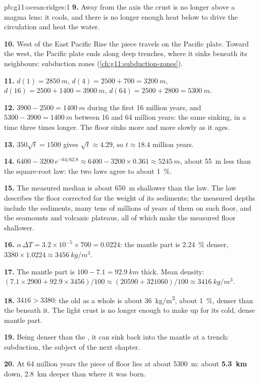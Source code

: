 \begin{solution}{pb:g11:ocean-ridges:1}
\textbf{9.} Away from the axis the crust is no longer above a magma lens: it
cools, and there is no longer enough heat below to drive the circulation and
heat the water.

\textbf{10.} West of the East Pacific Rise the piece travels on the Pacific
plate. Toward the west, the Pacific plate ends along deep trenches, where it
sinks beneath its neighbours: subduction zones (\cref{ch:g11:subduction-zones}).

\textbf{11.} $d(1) = \qty{2850}{m}$, $d(4) = 2500 + 700 = \qty{3200}{m}$,
$d(16) = 2500 + 1400 = \qty{3900}{m}$, $d(64) = 2500 + 2800 = \qty{5300}{m}$.

\textbf{12.} $3900 - 2500 = \qty{1400}{m}$ during the first 16 million years,
and $5300 - 3900 = \qty{1400}{m}$ between 16 and 64 million years: the same
sinking, in a time three times longer. The floor sinks more and more slowly
as it ages.

\textbf{13.} $350\sqrt{t} = 1500$ gives $\sqrt{t} \approx 4.29$, so
$t \approx 18.4$ million years.

\textbf{14.} $6400 - 3200\,e^{-64/62.8} \approx 6400 - 3200 \times 0.361
\approx \qty{5245}{m}$, about \qty{55}{m} less than the square-root law: the
two laws agree to about \qty{1}{\percent}.

\textbf{15.} The measured median is about \qty{650}{m} shallower than the
law. The law describes the floor corrected for the weight of its sediments;
the measured depths include the sediments, many tens of millions of years of
them on such floor, and the seamounts and volcanic plateaus, all of which make
the measured floor shallower.

\textbf{16.} $\alpha\,\Delta T = 3.2 \times 10^{-5} \times 700 = 0.0224$: the
mantle part is \qty{2.24}{\percent} denser,
$3380 \times 1.0224 \approx \qty{3456}{kg/m^3}$.

\textbf{17.} The mantle part is $100 - 7.1 = \qty{92.9}{km}$ thick. Mean
density: $(7.1 \times 2900 + 92.9 \times 3456)/100 \approx (20590 + 321060)/100
\approx \qty{3416}{kg/m^3}$.

\textbf{18.} $3416 > 3380$: the old  as a whole is about
\qty{36}{kg/m^3}, about \qty{1}{\percent}, denser than the 
beneath it. The light crust is no longer enough to make up for its cold,
dense mantle part.

\textbf{19.} Being denser than the , it can sink back into the
mantle at a trench: subduction, the subject of the next chapter.

\textbf{20.} At 64 million years the piece of floor lies at about
\qty{5300}{m}: about \textbf{5.3~km} down, \qty{2.8}{km} deeper than where it
was born.
\end{solution}
